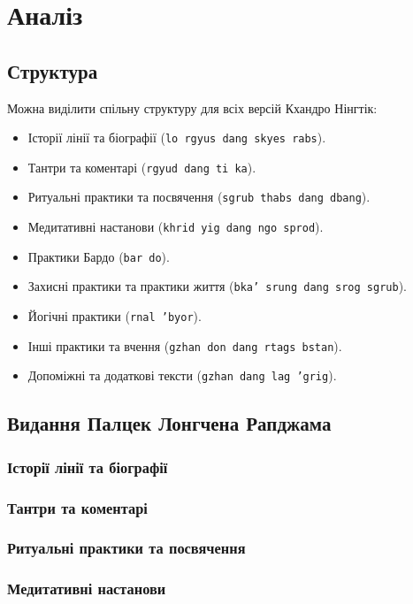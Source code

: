 \documentclass{article}
\begin{document}
\section{Аналіз}

\subsection{Структура}

Можна виділити спільну структуру для всіх версій Кхандро Нінгтік:

\begin{itemize}
\item Історії лінії та біографії (\texttt{lo rgyus dang skyes rabs}).
\item Тантри та коментарі (\texttt{rgyud dang ti ka}).
\item Ритуальні практики та посвячення (\texttt{sgrub thabs dang dbang}).
\item Медитативні настанови (\texttt{khrid yig dang ngo sprod}).
\item Практики Бардо (\texttt{bar do}).
\item Захисні практики та практики життя (\texttt{bka' srung dang srog sgrub}).
\item Йогічні практики (\texttt{rnal 'byor}).
\item Інші практики та вчення (\texttt{gzhan don dang rtags bstan}).
\item Допоміжні та додаткові тексти (\texttt{gzhan dang lag 'grig}).
\end{itemize}

\newpage
\subsection{Видання Палцек Лонгчена Рапджама}

\subsubsection{Історії лінії та біографії}
\subsubsection{Тантри та коментарі}
\subsubsection{Ритуальні практики та посвячення}
\subsubsection{Медитативні настанови}
\end{document}
